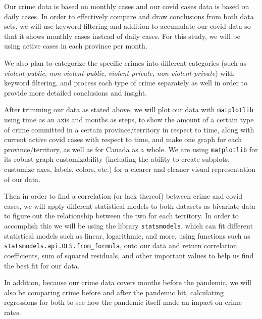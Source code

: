 \documentclass[fontsize=11pt]{article}
\begin{document}
Our crime data is based on monthly cases and our covid cases data is based on daily cases. In order to effectively compare and draw conclusions from both data sets, we will use keyword filtering and addition to accumulate our covid data so that it shows monthly cases instead of daily cases. For this study, we will be using active cases in each province per month.

We also plan to categorize the specific crimes into different categories (such as \textit{violent-public}, \textit{non-violent-public}, \textit{violent-private}, \textit{non-violent-private}) with keyword filtering, and process each type of crime separately as well in order to provide more detailed conclusions and insight.

After trimming our data as stated above, we will plot our data with \verb+matplotlib+ using time as an axis and months as steps, to show the amount of a certain type of crime committed in a certain province/territory in respect to time, along with current active covid cases with respect to time, and make one graph for each province/territory, as well as for Canada as a whole. We are using \verb+matplotlib+ for its robust graph customizability (including the ability to create subplots, customize axes, labels, colors, etc.) for a clearer and cleaner visual representation of our data.

Then in order to find a correlation (or lack thereof) between crime and covid cases, we will apply different statistical models to both datasets as bivariate data to figure out the relationship between the two for each territory. In order to accomplish this we will be using the library \verb+statsmodels+, which can fit different statistical models such as linear, logarithmic, and more, using functions such as  \verb+statsmodels.api.OLS.from_formula+, onto our data and return correlation coefficients, sum of squared residuals, and other important values to help us find the best fit for our data.

In addition, because our crime data covers months before the pandemic, we will also be comparing crime before and after the pandemic hit, calculating regressions for both to see how the pandemic itself made an impact on crime rates.
\end{document}
